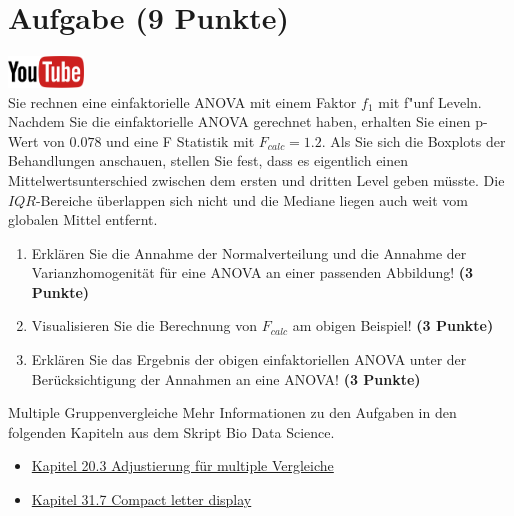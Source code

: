 \documentclass[a4paper, 9pt]{scrartcl}\usepackage[]{graphicx}\usepackage[]{xcolor}
\begin{document}
 
\clearpage

\section{Aufgabe \hfill (9 Punkte)}

\hfill\href{https://youtu.be/M9Uhm67ndxM}{\includegraphics[width =
  2cm]{img/youtube}}\\[1Ex]




Sie rechnen eine einfaktorielle ANOVA mit einem Faktor $f_1$ mit
f{"u}nf Leveln. Nachdem Sie die einfaktorielle ANOVA gerechnet
haben, erhalten Sie einen p-Wert von $0.078$ und eine F Statistik mit
$F_{calc} = 1.2$. Als Sie sich die Boxplots der Behandlungen anschauen,
stellen Sie fest, dass es eigentlich einen Mittelwertsunterschied zwischen
dem ersten und dritten Level geben m{\"u}sste. Die
$IQR$-Bereiche {\"u}berlappen sich nicht und die Mediane liegen auch weit vom
globalen Mittel entfernt.


\begin{enumerate}
\item Erkl{\"a}ren Sie die Annahme der Normalverteilung und die Annahme der
  Varianzhomogenit{\"a}t f{\"u}r eine ANOVA an einer passenden Abbildung! \textbf{(3 Punkte)}
\item Visualisieren Sie die Berechnung von $F_{calc}$ am obigen Beispiel!
  \textbf{(3 Punkte)}
\item Erkl{\"a}ren Sie das Ergebnis der obigen einfaktoriellen ANOVA unter der
  Ber{\"u}cksichtigung der Annahmen an eine ANOVA! \textbf{(3 Punkte)}
\end{enumerate}

 
\clearpage
\begin{graybox}{Multiple Gruppenvergleiche}
Mehr Informationen zu den Aufgaben in den folgenden Kapiteln aus dem Skript Bio Data Science.
  \begin{itemize}
  \item \href{https://jkruppa.github.io/stat-tests-theorie.html}{Kapitel 20.3 Adjustierung für multiple Vergleiche}
  \item \href{https://jkruppa.github.io/stat-tests-posthoc.html}{Kapitel 31.7 Compact letter display}
  \end{itemize}
\end{graybox}
\clearpage
\end{document}
